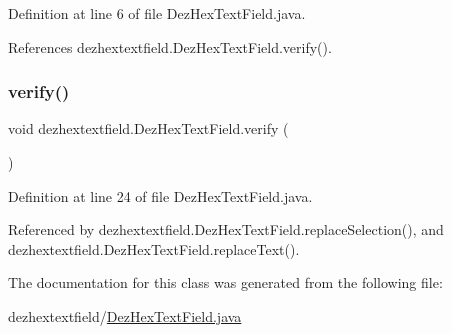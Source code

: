 Definition at line 6 of file Dez\+Hex\+Text\+Field.\+java.



References dezhextextfield.\+Dez\+Hex\+Text\+Field.\+verify().

\mbox{\label{classdezhextextfield_1_1_dez_hex_text_field_a091d736c5cbf7c6aa896539399df3b33}} 
\subsubsection{\texorpdfstring{verify()}{verify()}}
{\footnotesize\ttfamily void dezhextextfield.\+Dez\+Hex\+Text\+Field.\+verify (\begin{DoxyParamCaption}{ }\end{DoxyParamCaption})\hspace{0.3cm}{\ttfamily [private]}}



Definition at line 24 of file Dez\+Hex\+Text\+Field.\+java.



Referenced by dezhextextfield.\+Dez\+Hex\+Text\+Field.\+replace\+Selection(), and dezhextextfield.\+Dez\+Hex\+Text\+Field.\+replace\+Text().



The documentation for this class was generated from the following file\+:\begin{DoxyCompactItemize}
\item 
dezhextextfield/\hyperlink{_dez_hex_text_field_8java}{Dez\+Hex\+Text\+Field.\+java}\end{DoxyCompactItemize}
